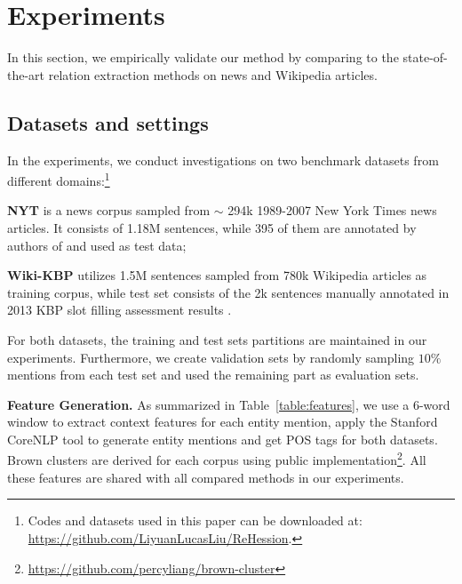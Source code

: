 
\section{Experiments}
\label{sect:exp}

In this section, we empirically validate our method by comparing to the state-of-the-art relation extraction methods on news and Wikipedia articles.


\subsection{Datasets and settings}
In the experiments, we conduct investigations on two benchmark datasets from different domains:\footnote{ Codes and datasets used in this paper can be downloaded at: \url{https://github.com/LiyuanLucasLiu/ReHession}.}

\noindent
\textbf{\small NYT} \cite{riedel2010modeling} is a news corpus sampled from $\sim$ 294k 1989-2007 New York Times news articles. It consists of 1.18M sentences, while 395 of them are annotated by authors of \cite{hoffmann2011knowledge} and used as test data;

\noindent
\textbf{\small Wiki-KBP} utilizes 1.5M sentences sampled from 780k Wikipedia articles \cite{ling2012fine} as training corpus, while test set consists of the 2k sentences manually annotated in 2013 KBP slot filling assessment results \cite{ellis2012linguistic}.

For both datasets, the training and test sets partitions are maintained in our experiments. 
Furthermore, we create validation sets by randomly sampling $10\%$ mentions from each test set and used the remaining part as evaluation sets. 

\smallskip
\noindent
\textsf{\small\textbf{Feature Generation. }} 
As summarized in Table~\ref{table:features}, we use a 6-word window to extract context features for each entity mention, 
apply the Stanford CoreNLP tool \cite{manning2014stanford} to generate entity mentions and get POS tags for both datasets. Brown clusters\cite{brown1992class} are derived for each corpus using public implementation\footnote{\url{https://github.com/percyliang/brown-cluster}}. All these features are shared with all compared methods in our experiments.


